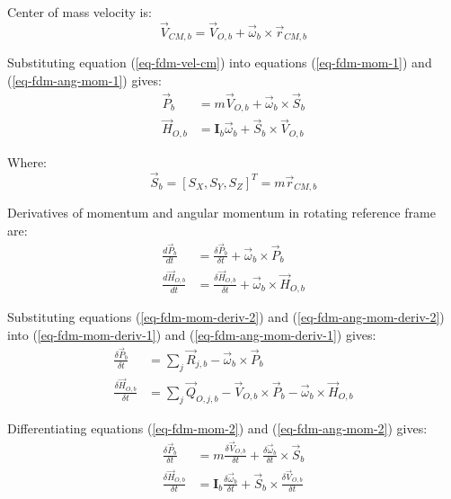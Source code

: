 Center of mass velocity is:
\begin{equation}
  \label{eq-fdm-vel-cm}
  {\vec V}_{CM,b}
  =
  {\vec V}_{O,b} + {\vec \omega}_b \times {\vec r}_{CM,b}
\end{equation}

Substituting equation (\ref{eq-fdm-vel-cm}) into equations (\ref{eq-fdm-mom-1}) and (\ref{eq-fdm-ang-mom-1}) gives:
\begin{align}
  \label{eq-fdm-mom-2} 
  {\vec P}_b
  &=
  m {\vec V}_{O,b} + {\vec \omega}_b
  \times
  {\vec S}_b \\
  \label{eq-fdm-ang-mom-2}
  {\vec H}_{O,b}
  &=
  {\boldsymbol I}_b {\vec \omega}_b
  +
  {\vec S}_b \times {\vec V}_{O,b}
\end{align}

Where:
\begin{equation}
  {\vec S}_b = \left[ S_X, S_Y, S_Z \right]^T = m {\vec r}_{CM,b}
\end{equation}

Derivatives of momentum and angular momentum in rotating reference frame are: \cite{Taylor2005, Osinski1997, Leyko2002}
\begin{align}
  \label{eq-fdm-mom-deriv-2} 
  \frac{d {\vec P}_b}{dt}
  &=
  \frac{\delta {\vec P}_b}{\delta t}
  +
  {\vec \omega}_b \times {\vec P}_b \\
  \label{eq-fdm-ang-mom-deriv-2}
  \frac{d {\vec H}_{O,b}}{dt}
  &=
  \frac{\delta {\vec H}_{O,b}}{\delta t}
  +
  {\vec \omega}_b \times {\vec H}_{O,b}
\end{align}

Substituting equations (\ref{eq-fdm-mom-deriv-2}) and (\ref{eq-fdm-ang-mom-deriv-2}) into (\ref{eq-fdm-mom-deriv-1}) and (\ref{eq-fdm-ang-mom-deriv-1}) gives:
\begin{align}
  \label{eq-fdm-mom-deriv-3}
  \frac{\delta {\vec P}_b}{\delta t}
  &=
  \sum_{j} {\vec R}_{j,b}
  -
  {\vec \omega}_b \times {\vec P}_b \\
  \label{eq-fdm-ang-mom-deriv-3}
  \frac{\delta {\vec H}_{O,b}}{\delta t}
  &=
  \sum_{j} {\vec Q}_{O,j,b}
  -
  {\vec V}_{O,b} \times {\vec P}_b
  -
  {\vec \omega}_b \times {\vec H}_{O,b}
\end{align}

Differentiating equations (\ref{eq-fdm-mom-2}) and (\ref{eq-fdm-ang-mom-2}) gives:
\begin{align}
  \label{eq-fdm-mom-deriv-4}
  \frac{\delta {\vec P}_b}{\delta t}
  &=
  m \frac{\delta {\vec V}_{O,b}}{\delta t}
  +
  \frac{\delta {\vec \omega}_b}{\delta t}
  \times
  {\vec S}_b \\
  \label{eq-fdm-ang-mom-deriv-4}
  \frac{\delta {\vec H}_{O,b}}{\delta t}
  &=
  {\boldsymbol I}_b \frac{\delta {\vec \omega}_b}{\delta t}
  +
  {\vec S}_b
  \times
  \frac{\delta {\vec V}_{O,b}}{\delta t}
\end{align}

